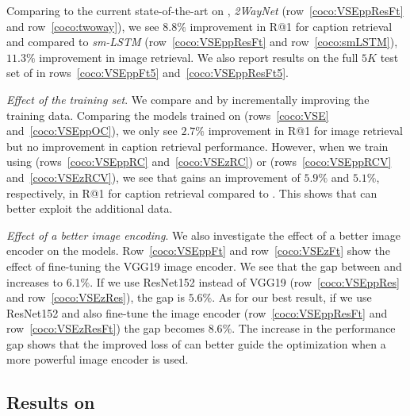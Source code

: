 Comparing \VSEppResFt{} to the current state-of-the-art on \coco{}, {\em 
2WayNet}\/ (row~\ref{coco:VSEppResFt} and row~\ref{coco:twoway}), we see 
$8.8\%$ improvement in R@1 for caption retrieval and compared to 
{\em sm-LSTM}\/ (row~\ref{coco:VSEppResFt} and row~\ref{coco:smLSTM}), 
$11.3\%$ improvement in image retrieval.
We also report results on the full $5K$ test set of \coco{} in 
rows~\ref{coco:VSEppFt5} and~\ref{coco:VSEppResFt5}.

\emph{Effect of the training set}. We compare \VSEz{} and \VSEpp{} by 
incrementally improving the training data.  Comparing the models trained on 
\OC{} (rows~\ref{coco:VSE} and~\ref{coco:VSEppOC}), we only see $2.7\%$ 
improvement in R@1 for image retrieval but no improvement in caption retrieval 
performance. However, when we train using \RC{} (rows~\ref{coco:VSEppRC} 
and~\ref{coco:VSEzRC}) or \RCV{} (rows~\ref{coco:VSEppRCV} 
and~\ref{coco:VSEzRCV}), we see that \VSEpp{} gains an improvement of $5.9\%$ 
and $5.1\%$, respectively,  in R@1 for caption retrieval compared to \VSEz{}.  
This shows that \VSEpp{} can better exploit the additional data.

\emph{Effect of a better image encoding}. We also investigate the effect of 
a better image encoder on the models.  Row~\ref{coco:VSEppFt} and 
row~\ref{coco:VSEzFt} show the effect of fine-tuning the VGG19 image encoder. 
We see that the gap between \VSEz{} and \VSEpp{} increases to $6.1\%$. If we 
use ResNet152 instead of VGG19 (row~\ref{coco:VSEppRes} and 
row~\ref{coco:VSEzRes}), the gap is $5.6\%$. As for our best result, if we use 
ResNet152 and also fine-tune the image encoder (row~\ref{coco:VSEppResFt} and 
row~\ref{coco:VSEzResFt}) the gap becomes $8.6\%$. The increase in the 
performance gap shows that the improved loss of \VSEpp{} can better guide the 
optimization when a more powerful image encoder is used.

\subsection{Results on \fthk{}}

